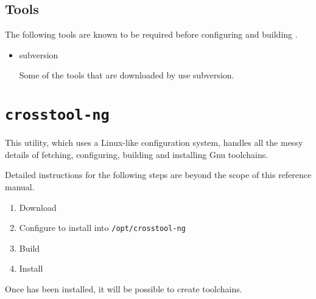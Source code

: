 \subsection{Tools}

The following tools are known to be required before configuring and
building \ctng.

\begin{itemize}
\item{subversion}

  Some of the tools that are downloaded by \ctng use subversion.

\end{itemize}

\section{\texttt{crosstool-ng}}\label{toolchain-config:install-ctng}

This utility, which uses a Linux-like configuration system, handles
all the messy details of fetching, configuring, building and
installing Gnu toolchains.

Detailed instructions for the following steps are beyond the scope of
this reference manual.

\begin{enumerate}
\item Download \ctng

\item Configure \ctng to install into \texttt{/opt/crosstool-ng}

\item Build \ctng

\item Install \ctng

\end{enumerate}

Once \ctng has been installed, it will be possible to create
toolchains.

